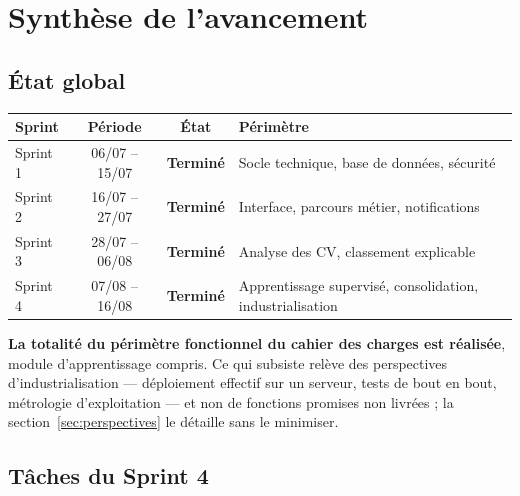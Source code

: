 \documentclass[11pt,a4paper]{article}
\begin{document}
\section{Synthèse de l'avancement}

\subsection{État global}

\begin{center}
\small
\begin{tabular}{lccp{5.4cm}}
  \toprule
  \textbf{Sprint} & \textbf{Période} & \textbf{État} & \textbf{Périmètre} \\
  \midrule
  Sprint 1 & 06/07 -- 15/07 & \textcolor{vert}{\textbf{Terminé}} & Socle technique, base de données, sécurité \\[1mm]
  Sprint 2 & 16/07 -- 27/07 & \textcolor{vert}{\textbf{Terminé}} & Interface, parcours métier, notifications \\[1mm]
  Sprint 3 & 28/07 -- 06/08 & \textcolor{vert}{\textbf{Terminé}} & Analyse des CV, classement explicable \\[1mm]
  Sprint 4 & 07/08 -- 16/08 & \textcolor{vert}{\textbf{Terminé}} & Apprentissage supervisé, consolidation, industrialisation \\
  \bottomrule
\end{tabular}
\end{center}

\vspace{2mm}
\noindent \textbf{La totalité du périmètre fonctionnel du cahier des charges est réalisée}, module d'apprentissage compris. Ce qui subsiste relève des perspectives d'industrialisation --- déploiement effectif sur un serveur, tests de bout en bout, métrologie d'exploitation --- et non de fonctions promises non livrées ; la section~\ref{sec:perspectives} le détaille sans le minimiser.

\subsection{Tâches du Sprint 4}
\end{document}
